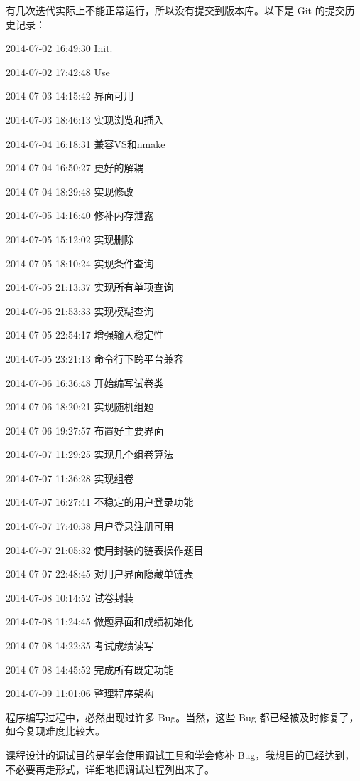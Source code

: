 有几次迭代实际上不能正常运行，所以没有提交到版本库。以下是 Git 的提交历史记录：
\begin{asparaenum}[1.]
\item 2014-07-02 16:49:30 Init.
\item 2014-07-02 17:42:48 Use
\item 2014-07-03 14:15:42 界面可用
\item 2014-07-03 18:46:13 实现浏览和插入
\item 2014-07-04 16:18:31 兼容VS和nmake
\item 2014-07-04 16:50:27 更好的解耦
\item 2014-07-04 18:29:48 实现修改
\item 2014-07-05 14:16:40 修补内存泄露
\item 2014-07-05 15:12:02 实现删除
\item 2014-07-05 18:10:24 实现条件查询
\item 2014-07-05 21:13:37 实现所有单项查询
\item 2014-07-05 21:53:33 实现模糊查询
\item 2014-07-05 22:54:17 增强输入稳定性
\item 2014-07-05 23:21:13 命令行下跨平台兼容
\item 2014-07-06 16:36:48 开始编写试卷类
\item 2014-07-06 18:20:21 实现随机组题
\item 2014-07-06 19:27:57 布置好主要界面
\item 2014-07-07 11:29:25 实现几个组卷算法
\item 2014-07-07 11:36:28 实现组卷
\item 2014-07-07 16:27:41 不稳定的用户登录功能
\item 2014-07-07 17:40:38 用户登录注册可用
\item 2014-07-07 21:05:32 使用封装的链表操作题目
\item 2014-07-07 22:48:45 对用户界面隐藏单链表
\item 2014-07-08 10:14:52 试卷封装
\item 2014-07-08 11:24:45 做题界面和成绩初始化
\item 2014-07-08 14:22:35 考试成绩读写
\item 2014-07-08 14:45:52 完成所有既定功能
\item 2014-07-09 11:01:06 整理程序架构
\end{asparaenum}

程序编写过程中，必然出现过许多 Bug。当然，这些 Bug 都已经被及时修复了，如今复现难度比较大。

课程设计的调试目的是学会使用调试工具和学会修补 Bug，我想目的已经达到，不必要再走形式，详细地把调试过程列出来了。
